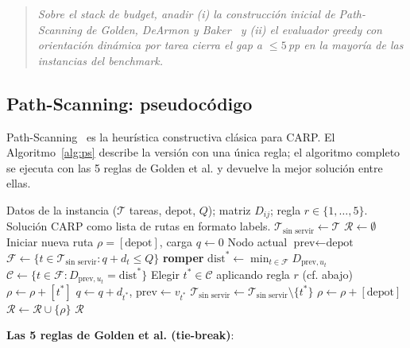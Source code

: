 \begin{quote}
\textit{Sobre el stack de budget, anadir (i) la construcción inicial
de Path-Scanning de Golden, DeArmon y Baker~\cite{golden1983} y (ii) el evaluador
greedy con orientación dinámica por tarea cierra el gap a $\le 5$\,pp
en la mayoría de las instancias del benchmark.}
\end{quote}

\subsection{Path-Scanning: pseudocódigo}

Path-Scanning~\cite{golden1983} es la heurística constructiva clásica para CARP. El
Algoritmo~\ref{alg:ps} describe la versión con una única regla; el
algoritmo completo se ejecuta con las 5 reglas de Golden et al. y
devuelve la mejor solución entre ellas.

\begin{algorithm}[h]
\caption{Path-Scanning con regla $r$.}
\label{alg:ps}
\begin{algorithmic}[1]
\Require Datos de la instancia ($\mathcal{T}$ tareas, $\text{depot}$, $Q$);
  matriz $D_{ij}$; regla $r \in \{1, \dots, 5\}$.
\Ensure Solución CARP como lista de rutas en formato labels.
\State $\mathcal{T}_{\text{sin servir}} \gets \mathcal{T}$
\State $\mathcal{R} \gets \emptyset$
  \State Iniciar nueva ruta $\rho = [\text{depot}]$, carga $q \gets 0$
  \State Nodo actual $\text{prev} \gets \text{depot}$
    \State $\mathcal{F} \gets \{ t \in \mathcal{T}_{\text{sin servir}} : q + d_t \le Q \}$
     \textbf{romper} \EndIf
    \State $\mathrm{dist}^* \gets \min_{t \in \mathcal{F}} D_{\text{prev}, u_t}$
    \State $\mathcal{C} \gets \{ t \in \mathcal{F} : D_{\text{prev}, u_t} = \mathrm{dist}^* \}$
    \State Elegir $t^* \in \mathcal{C}$ aplicando regla $r$ (cf. abajo)
    \State $\rho \gets \rho + [t^*]$
    \State $q \gets q + d_{t^*}$, $\text{prev} \gets v_{t^*}$
    \State $\mathcal{T}_{\text{sin servir}} \gets \mathcal{T}_{\text{sin servir}} \setminus \{t^*\}$
  \EndWhile
  \State $\rho \gets \rho + [\text{depot}]$
  \State $\mathcal{R} \gets \mathcal{R} \cup \{\rho\}$
\EndWhile
\State \Return $\mathcal{R}$
\end{algorithmic}
\end{algorithm}

\textbf{Las 5 reglas de Golden et al. (tie-break)}:

